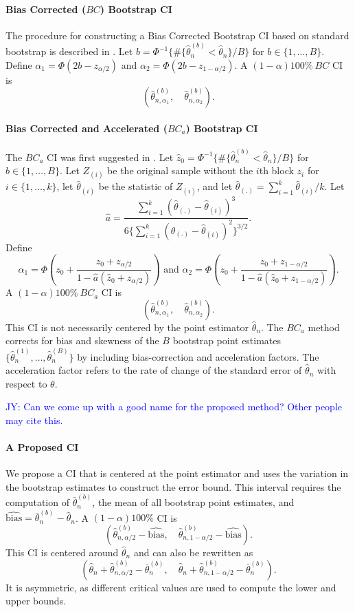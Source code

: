 \documentclass[12pt, letterpaper, titlepage]{article}
\newcommand{\jy}[1]{\textcolor{blue}{JY: #1}}
\begin{document}
\paragraph{Bias Corrected ($BC$) Bootstrap CI}
The procedure for constructing a Bias Corrected Bootstrap CI based on standard
bootstrap is described in \citet{carpenter2000bootstrap}.
Let $b = \Phi^{-1}\{\#\{\hat\theta_n^{(b)} < \hat{\theta}_n\} / B\}$
for $b \in \{1, \ldots, B\}$. Define
$\alpha_1 = \Phi(2b - z_{\alpha/2})$ and 
$\alpha_2 = \Phi(2b - z_{1 - \alpha/2})$.
A $(1 - \alpha)100\%~BC$ CI is
\[
(\hat\theta_{n, \alpha_1}^{(b)}, \quad \hat\theta_{n, \alpha_2}^{(b)}).
\]


\paragraph{Bias Corrected and Accelerated ($BC_a$) Bootstrap CI}
The $BC_a$ CI was first suggested in \citet{efron1987better}.
Let $\hat{z}_0 = \Phi^{-1}\{\#\{\hat\theta_n^{(b)} < \hat{\theta}_n\} / B\}$
for $b \in \{1, \ldots, B\}$. 
Let $Z_{(i)}$ be the original sample without the $i$th block $z_i$ for 
$i \in \{1, \ldots, k\}$, let
$\hat{\theta}_{(i)}$ be the statistic of $Z_{(i)}$,
and let $\hat{\theta}_{(.)} = \sum_{i=1}^{k} \hat{\theta}_{(i)} / k$. 
Let 
\[
\hat{a} = \frac{\sum_{i=1}^{k} (\hat{\theta}_{(.)} -
  \hat{\theta}_{(i)})^3}{6\{\sum_{i=1}^{k} (\hat{\theta}_{(.)} -
  \hat{\theta}_{(i)})^2\}^{3/2}}.
\]
Define
\[
\alpha_1 = \Phi\left(z_0 + \frac{z_{0} +
  z_{\alpha/2}}{1 - \hat{a}(\hat{z}_{0} + z_{\alpha/2})}\right)
\text{ and }
\alpha_2 = \Phi\left(z_0 + \frac{z_{0} +
  z_{1 - \alpha/2}}{1 - \hat{a}(\hat{z}_{0} + z_{1 - \alpha/2})}\right).
\]
A $(1 - \alpha)100\%~BC_a$ CI is
\[
(\hat\theta_{n, \alpha_1}^{(b)}, \quad \hat\theta_{n, \alpha_2}^{(b)}).
\]
This CI is not necessarily centered by the point estimator $\hat\theta_n$. The
$BC_a$ method corrects for bias and skewness of the $B$ bootstrap point
estimates $\{\hat\theta_n^{(1)}, \ldots, \hat\theta_n^{(B)}\}$ by including
bias-correction and acceleration factors. The acceleration factor refers to
the 
rate of change of the standard error of $\hat\theta_n$ with respect to
$\theta$.


\jy{Can we come up with a good name for the proposed method? Other people may cite this.}
\paragraph{A Proposed CI}
We propose a CI that is centered at the point estimator and uses the variation
in the bootstrap estimates to construct the error bound. This interval requires
the computation of $\bar\theta_n^{(b)}$, the mean of all bootstrap point
estimates, and $\widehat{\text{bias}} = \bar\theta_n^{(b)} - \hat\theta_n$.
A $(1 - \alpha)100\%$ CI is
\[
(\hat\theta_{n, \alpha/2}^{(b)} - \widehat{\text{bias}}, \quad
\hat\theta_{n, 1 - \alpha/2}^{(b)} - \widehat{\text{bias}}).
\]
This CI is centered around $\hat\theta_n$ and can also be rewritten
as 
\[
(\hat\theta_n + \hat\theta_{n, \alpha/2}^{(b)} - \bar\theta_n^{(b)}, \quad
\hat\theta_n + \hat\theta_{n, 1 - \alpha/2}^{(b)} - \bar\theta_n^{(b)}).
\]
It is asymmetric, as different critical values are used to compute
the lower and upper bounds.
\end{document}
